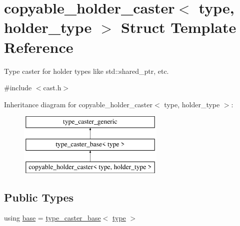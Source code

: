 \hypertarget{structcopyable__holder__caster}{}\section{copyable\+\_\+holder\+\_\+caster$<$ type, holder\+\_\+type $>$ Struct Template Reference}
\label{structcopyable__holder__caster}


Type caster for holder types like std\+::shared\+\_\+ptr, etc.  




{\ttfamily \#include $<$cast.\+h$>$}

Inheritance diagram for copyable\+\_\+holder\+\_\+caster$<$ type, holder\+\_\+type $>$\+:\begin{figure}[H]
\begin{center}
\leavevmode
\includegraphics[height=3.000000cm]{structcopyable__holder__caster}
\end{center}
\end{figure}
\subsection*{Public Types}
\begin{DoxyCompactItemize}
\item 
using \mbox{\hyperlink{structcopyable__holder__caster_a5d25e9cc9ce588710bb255ddd1b904de}{base}} = \mbox{\hyperlink{classtype__caster__base}{type\+\_\+caster\+\_\+base}}$<$ \mbox{\hyperlink{_s_d_l__opengl_8h_ad5ddf6fca7b585646515660e810e0188}{type}} $>$
\end{DoxyCompactItemize}
